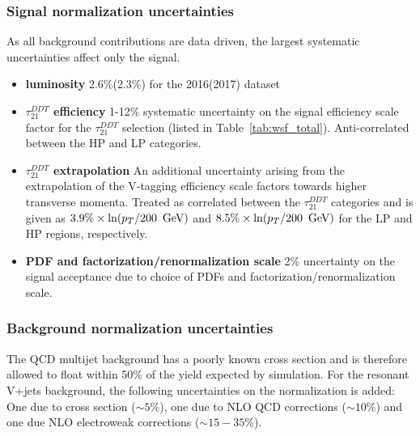 \subsubsection{Signal normalization uncertainties}
As all background contributions are data driven, the largest systematic uncertainties affect only the signal.
\begin{itemize}
\item {\bf luminosity } 2.6\%(2.3\%) for the 2016(2017) dataset
\item {\bf $\tau_{21}^{DDT}$ efficiency } 1-12\% systematic uncertainty on the signal efficiency scale factor for the $\tau_{21}^{DDT}$ selection (listed in Table~\ref{tab:wsf_total}). Anti-correlated between the HP and LP categories.
\item {\bf $\tau_{21}^{DDT}$ \PT{} extrapolation } An additional uncertainty arising from the extrapolation of the V-tagging efficiency scale factors towards higher transverse momenta. Treated as correlated between the $\tau_{21}^{DDT}$ categories and is given as $3.9\% \times \ln(p_T/200~\,\text{Ge\hspace{-.08em}V})$ and $8.5\% \times \ln(p_T/200~\,\text{Ge\hspace{-.08em}V})$ for the LP and HP regions, respectively. 
\item {\bf PDF and factorization/renormalization scale } 2\% uncertainty on the signal acceptance due to choice of PDFs and factorization/renormalization scale. 
\end{itemize} 


\subsubsection{Background normalization uncertainties}
The QCD multijet background has a poorly known cross section and is therefore allowed to float within 50\% of the yield expected by simulation. For the resonant V+jets background, the following uncertainties on the normalization is added: One due to cross section ($\sim5\%$), one due to NLO QCD corrections ($\sim10\%$) and one due NLO electroweak corrections ($\sim15-35\%$).

